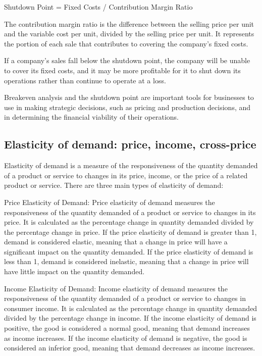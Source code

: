 \documentclass[12pt, a4paper, oneside]{article}
\begin{document}
Shutdown Point = Fixed Costs / Contribution Margin Ratio

The contribution margin ratio is the difference between the selling price per unit and the variable cost per unit, divided by the selling price per unit. It represents the portion of each sale that contributes to covering the company's fixed costs.

If a company's sales fall below the shutdown point, the company will be unable to cover its fixed costs, and it may be more profitable for it to shut down its operations rather than continue to operate at a loss.

Breakeven analysis and the shutdown point are important tools for businesses to use in making strategic decisions, such as pricing and production decisions, and in determining the financial viability of their operations.
\subsection{ Elasticity of demand: price, income, cross-price }
Elasticity of demand is a measure of the responsiveness of the quantity demanded of a product or service to changes in its price, income, or the price of a related product or service. There are three main types of elasticity of demand:

Price Elasticity of Demand: Price elasticity of demand measures the responsiveness of the quantity demanded of a product or service to changes in its price. It is calculated as the percentage change in quantity demanded divided by the percentage change in price. If the price elasticity of demand is greater than 1, demand is considered elastic, meaning that a change in price will have a significant impact on the quantity demanded. If the price elasticity of demand is less than 1, demand is considered inelastic, meaning that a change in price will have little impact on the quantity demanded.

Income Elasticity of Demand: Income elasticity of demand measures the responsiveness of the quantity demanded of a product or service to changes in consumer income. It is calculated as the percentage change in quantity demanded divided by the percentage change in income. If the income elasticity of demand is positive, the good is considered a normal good, meaning that demand increases as income increases. If the income elasticity of demand is negative, the good is considered an inferior good, meaning that demand decreases as income increases.
\end{document}
